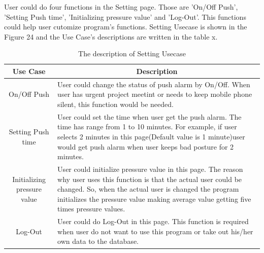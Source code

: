 \documentclass[conference]{IEEEtran}
\begin{document}
 User could do four functions in the Setting page. Those are 'On/Off Push', 'Setting Push time', 'Initializing pressure value' and 'Log-Out'. This functions could help user cutomize program's functions. Setting Usecase is shown in the Figure 24 and the Use Case's descriptions are written in the table x.

\begin{table}[h]
{\renewcommand\arraystretch{1.25}
\caption{The description of Setting Usecase}
\begin{tabular}{|c|l|l|} \hline
Use Case & \multicolumn{2}{c|}{Description} \\ \hline\hline
On/Off Push & \multicolumn{2}{p{5cm}|}{\raggedright User could change the status of push alarm by On/Off. When user has urgent project meetint or needs to keep mobile phone silent, this function would be needed.} \\ \hline
Setting Push time & \multicolumn{2}{p{5cm}|}{\raggedright User could set the time when user get the push alarm. The time has range from 1 to 10 minutes. For example, if user selects 2 minutes in this page(Default value is 1 minute)user would get push alarm when user keeps bad posture for 2 minutes.  } \\ \hline
Initializing pressure value & \multicolumn{2}{p{5cm}|}{\raggedright User could initialize pressure value in this page. The reason why user uses this function is that the actual user could be changed. So, when the actual user is changed the program initializes the pressure value making average value getting five times pressure values. } \\ \hline
Log-Out & \multicolumn{2}{p{5cm}|}{\raggedright User could do Log-Out in this page. This function is required when user do not want to use this program or take out his/her own data to the database. } \\ \hline
\end{tabular}}
\end{table}
\end{document}
